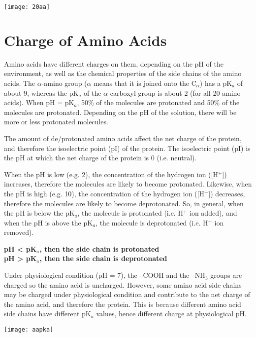 \texttt{[image: 20aa]}

\section{Charge of Amino Acids}

Amino acids have different charges on them, depending on the pH of the environment, as well as the chemical properties of the side chains of the amino acids.
The $\alpha$-amino group ($\alpha$ means that it is joined onto the C$_{\alpha}$) has a pK$_a$ of about 9, whereas the pK$_a$ of the $\alpha$-carboxyl group is about 2 (for all 20 amino acids).
When pH = pK$_a$, 50\% of the molecules are protonated and 50\% of the molecules are protonated.
Depending on the pH of the solution, there will be more or less protonated molecules.

The amount of de/protonated amino acids affect the net charge of the protein, and therefore the isoelectric point (pI) of the protein.
The isoelectric point (pI) is the pH at which the net charge of the protein is 0 (i.e. neutral).

When the pH is low (e.g. 2), the concentration of the hydrogen ion ([H$^+$]) increases, therefore the molecules are likely to become protonated.
Likewise, when the pH is high (e.g. 10), the concentration of the hydrogen ion ([H$^+$]) decreases, therefore the molecules are likely to become deprotonated.
So, in general, when the pH is below the pK$_a$, the molecule is protonated (i.e. H$^+$ ion added), and when the pH is above the pK$_a$, the molecule is deprotonated (i.e. H$^+$ ion removed).

\begin{center}
    \textbf
        {pH \textless{} pK$_a$, then the side chain is protonated \\
        pH \textgreater{} pK$_a$, then the side chain is deprotonated}
\end{center}

Under physiological condition (pH = 7), the --COOH and the --NH$_3$ groups are charged so the amino acid is uncharged.
However, some amino acid side chains may be charged under physiological condition and contribute to the net charge of the amino acid, and therefore the protein.
This is because different amino acid side chains have different pK$_a$ values, hence different charge at physiological pH.

\begin{center}
\texttt{[image: aapka]}
\end{center}

